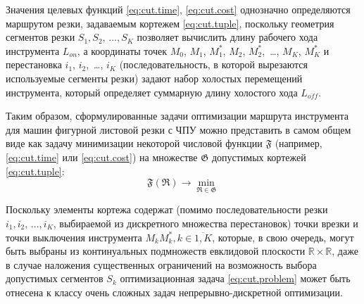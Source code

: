 Значения целевых функций \eqref{eq:cut.time}, \eqref{eq:cut.cost}
однозначно определяются маршрутом резки,
задаваемым кортежем \eqref{eq:cut.tuple},
поскольку геометрия сегментов резки
$S_1, S_2, \,\dots, S_K$
позволяет вычислить длину рабочего хода инструмента $L_{on}$,
а координаты точек
$M_0$, $M_1$, $M_1^*$, $M_2$, $M_2^*$, \,\dots, $M_K$, $M_K^*$
и перестановка
$i_1$, $i_2$, \,\dots, $i_K$
(последовательность, в которой вырезаются используемые сегменты резки)
задают набор холостых перемещений инструмента,
который определяет суммарную длину холостого хода
$L_{off}$.

Таким образом, сформулированные задачи оптимизации
маршрута инструмента для машин фигурной листовой резки с ЧПУ
можно представить в самом общем виде
как задачу минимизации некоторой числовой функции $\mathfrak F$
(например, \eqref{eq:cut.time} или \eqref{eq:cut.cost})
на множестве
$\mathfrak G$ допустимых кортежей
\eqref{eq:cut.tuple}:
\begin{equation}
  \mathfrak F(\mathfrak R) \to \min_{\mathfrak R \in \mathfrak G}
  \label{eq:cut.problem}
\end{equation}

Поскольку элементы кортежа содержат
(помимо последовательности резки
$i_1, i_2, \,\dots, i_K$,
выбираемой из дискретного множества перестановок)
точки врезки и точки выключения инструмента
$M_kM_k^*, k \in \overline{1,K}$,
которые, в свою очередь,
могут быть выбраны из континуальных подмножеств евклидовой плоскости
$\mathbb R \times \mathbb R$,
даже в случае наложения существенных ограничений
на возможность выбора допустимых сегментов
$S_k$
оптимизационная задача \eqref{eq:cut.problem}
может быть отнесена к классу очень сложных задач
непрерывно-дискретной оптимизации.
